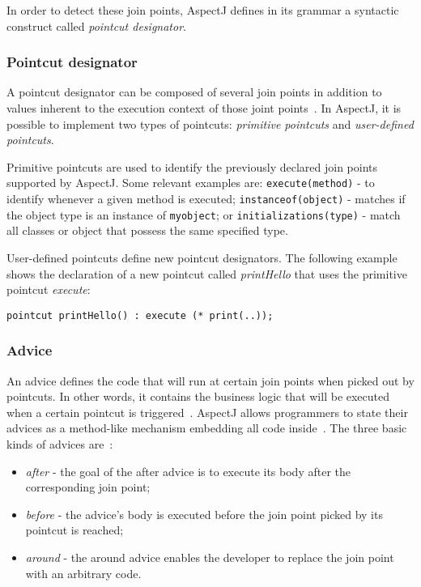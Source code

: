 \documentclass{template}
\begin{document}
In order to detect these join points, AspectJ defines in its grammar a syntactic construct called \textit{pointcut designator}.

\subsubsection{Pointcut designator}

A pointcut designator can be composed of several join points in addition to values inherent to the execution context of those joint points~\cite{Kiczales97aspect-orientedprogramming}. In AspectJ, it is possible to implement two types of pointcuts: \textit{primitive pointcuts} and \textit{user-defined pointcuts}.

Primitive pointcuts are used to identify the previously declared join points supported by AspectJ. Some relevant examples are: \texttt{execute(method)} - to identify whenever a given method is executed; \texttt{instanceof(object)} - matches if the object type is an instance of \texttt{myobject}; or \texttt{initializations(type)} - match all classes or object that possess the same specified type.

User-defined pointcuts define new pointcut designators. The following example shows the declaration of a new pointcut called \textit{printHello} that uses the primitive pointcut \textit{execute}: 

\verb!pointcut printHello() : execute (* print(..));!

\subsubsection{Advice}

An advice defines the code that will run at certain join points when picked out by pointcuts. In other words, it contains the business logic that will be executed when a certain pointcut is triggered~\cite{Kiselev2002}. AspectJ allows programmers to state their advices as a method-like mechanism embedding all code inside~\cite{Kiczales97aspect-orientedprogramming}. The three basic kinds of advices are~\cite{Kiselev2002}:

\begin{itemize}
\item \textit{after} - the goal of the after advice is to execute its body after the corresponding join point;
\item \textit{before} - the advice's body is executed before the join point picked by its pointcut is reached;
\item \textit{around} - the around advice enables the developer to replace the join point with an arbitrary code.
\end{itemize}
\end{document}
